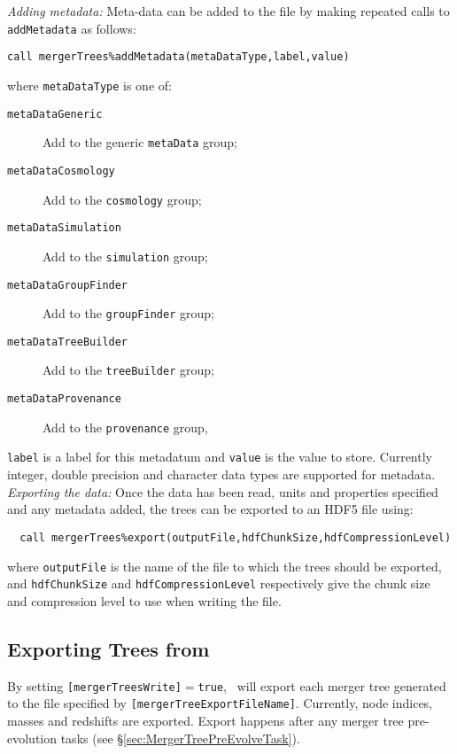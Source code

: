 \noindent \emph{Adding metadata:} Meta-data can be added to the file by making repeated calls to {\tt addMetadata} as follows:
\begin{verbatim}
call mergerTrees%addMetadata(metaDataType,label,value)
\end{verbatim}
where {\tt metaDataType} is one of:
\begin{description}
 \item [{\tt metaDataGeneric}] Add to the generic {\tt metaData} group;
 \item [{\tt metaDataCosmology}] Add to the {\tt cosmology} group;
 \item [{\tt metaDataSimulation}] Add to the {\tt simulation} group;
 \item [{\tt metaDataGroupFinder}] Add to the {\tt groupFinder} group;
 \item [{\tt metaDataTreeBuilder}] Add to the {\tt treeBuilder} group;
 \item [{\tt metaDataProvenance}] Add to the {\tt provenance} group,
\end{description}
{\tt label} is a label for this metadatum and {\tt value} is the value to store. Currently integer, double precision and character data types are supported for metadata.\\

\noindent \emph{Exporting the data:} Once the data has been read, units and properties specified and any metadata added, the trees can be exported to an HDF5 file using:
\begin{verbatim}
  call mergerTrees%export(outputFile,hdfChunkSize,hdfCompressionLevel)
\end{verbatim}
where {\tt outputFile} is the name of the file to which the trees should be exported, and {\tt hdfChunkSize} and {\tt hdfCompressionLevel} respectively give the chunk size and compression level to use when writing the file.

\subsection{Exporting Trees from \glc}

By setting {\tt [mergerTreesWrite]}$=${\tt true}, \glc\ will export each merger tree generated to the file specified by {\tt [mergerTreeExportFileName]}. Currently, node indices, masses and redshifts are exported. Export happens after any merger tree pre-evolution tasks (see \S\ref{sec:MergerTreePreEvolveTask}).
